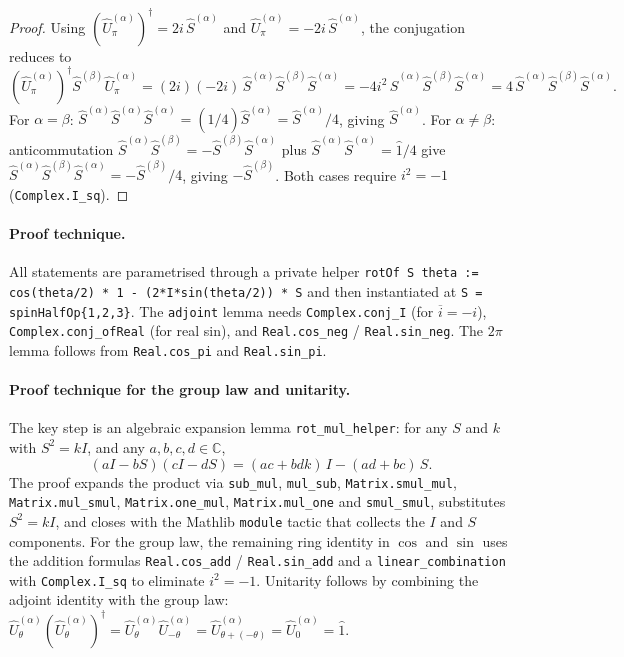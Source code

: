 \documentclass[a4paper,11pt]{article}
\begin{document}
\begin{proof}
Using $(\hat U^{(\alpha)}_\pi)^\dagger = 2i\,\hat S^{(\alpha)}$ and
$\hat U^{(\alpha)}_\pi = -2i\,\hat S^{(\alpha)}$, the conjugation
reduces to
\[
  (\hat U^{(\alpha)}_\pi)^\dagger \hat S^{(\beta)} \hat U^{(\alpha)}_\pi
    = (2i)(-2i)\,\hat S^{(\alpha)} \hat S^{(\beta)} \hat S^{(\alpha)}
    = -4 i^2\,\hat S^{(\alpha)} \hat S^{(\beta)} \hat S^{(\alpha)}
    = 4\,\hat S^{(\alpha)} \hat S^{(\beta)} \hat S^{(\alpha)}.
\]
For $\alpha = \beta$: $\hat S^{(\alpha)} \hat S^{(\alpha)} \hat S^{(\alpha)}
  = (\hat 1/4) \hat S^{(\alpha)} = \hat S^{(\alpha)}/4$, giving
$\hat S^{(\alpha)}$.
For $\alpha \neq \beta$: anticommutation
$\hat S^{(\alpha)} \hat S^{(\beta)} = -\hat S^{(\beta)} \hat S^{(\alpha)}$
plus $\hat S^{(\alpha)} \hat S^{(\alpha)} = \hat 1/4$ give
$\hat S^{(\alpha)} \hat S^{(\beta)} \hat S^{(\alpha)}
  = -\hat S^{(\beta)}/4$, giving $-\hat S^{(\beta)}$.
Both cases require $i^2 = -1$ (\texttt{Complex.I\_sq}).
\end{proof}

\paragraph{Proof technique.}
All statements are parametrised through a private helper
\texttt{rotOf S theta := cos(theta/2) * 1 - (2*I*sin(theta/2)) * S} and then
instantiated at \texttt{S = spinHalfOp\{1,2,3\}}. The
\texttt{adjoint} lemma needs \texttt{Complex.conj\_I} (for
$\overline{i} = -i$), \texttt{Complex.conj\_ofReal} (for real sin),
and \texttt{Real.cos\_neg} / \texttt{Real.sin\_neg}.
The $2\pi$ lemma follows from \texttt{Real.cos\_pi} and
\texttt{Real.sin\_pi}.

\paragraph{Proof technique for the group law and unitarity.}
The key step is an algebraic expansion lemma
\texttt{rot\_mul\_helper}: for any $S$ and $k$ with $S^2 = k I$, and
any $a, b, c, d \in \mathbb{C}$,
\[
  (aI - bS)(cI - dS) = (ac + bdk)\,I - (ad + bc)\,S.
\]
The proof expands the product via \texttt{sub\_mul}, \texttt{mul\_sub},
\texttt{Matrix.smul\_mul}, \texttt{Matrix.mul\_smul},
\texttt{Matrix.one\_mul}, \texttt{Matrix.mul\_one} and
\texttt{smul\_smul}, substitutes $S^2 = kI$, and closes with the
Mathlib \texttt{module} tactic that collects the $I$ and $S$ components.
For the group law, the remaining ring identity in $\cos$ and $\sin$
uses the addition formulas \texttt{Real.cos\_add} / \texttt{Real.sin\_add}
and a \texttt{linear\_combination} with \texttt{Complex.I\_sq} to
eliminate $i^2 = -1$. Unitarity follows by combining the adjoint
identity with the group law:
$\hat U^{(\alpha)}_\theta (\hat U^{(\alpha)}_\theta)^\dagger
  = \hat U^{(\alpha)}_\theta \hat U^{(\alpha)}_{-\theta}
  = \hat U^{(\alpha)}_{\theta + (-\theta)}
  = \hat U^{(\alpha)}_0 = \hat 1$.
\end{document}
